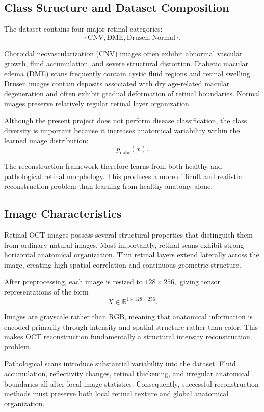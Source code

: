 \documentclass[12pt,oneside]{article}
\newcommand{\R}{\mathbb{R}}
\begin{document}
\subsection*{Class Structure and Dataset Composition}

The dataset contains four major retinal categories:
\[
\{\text{CNV}, \text{DME}, \text{Drusen}, \text{Normal}\}.
\]

Choroidal neovascularization (CNV) images often exhibit abnormal vascular growth, fluid accumulation, and severe structural distortion. Diabetic macular edema (DME) scans frequently contain cystic fluid regions and retinal swelling. Drusen images contain deposits associated with dry age-related macular degeneration and often exhibit gradual deformation of retinal boundaries. Normal images preserve relatively regular retinal layer organization.

Although the present project does not perform disease classification, the class diversity is important because it increases anatomical variability within the learned image distribution:
\[
p_{\mathrm{data}}(x).
\]

The reconstruction framework therefore learns from both healthy and pathological retinal morphology. This produces a more difficult and realistic reconstruction problem than learning from healthy anatomy alone.

\subsection*{Image Characteristics}

Retinal OCT images possess several structural properties that distinguish them from ordinary natural images. Most importantly, retinal scans exhibit strong horizontal anatomical organization. Thin retinal layers extend laterally across the image, creating high spatial correlation and continuous geometric structure.

After preprocessing, each image is resized to
\(128 \times 256,\)
giving tensor representations of the form
\[
X \in \R^{1 \times 128 \times 256}.
\]

Images are grayscale rather than RGB, meaning that anatomical information is encoded primarily through intensity and spatial structure rather than color. This makes OCT reconstruction fundamentally a structural intensity reconstruction problem.

Pathological scans introduce substantial variability into the dataset. Fluid accumulation, reflectivity changes, retinal thickening, and irregular anatomical boundaries all alter local image statistics. Consequently, successful reconstruction methods must preserve both local retinal texture and global anatomical organization.
\end{document}
